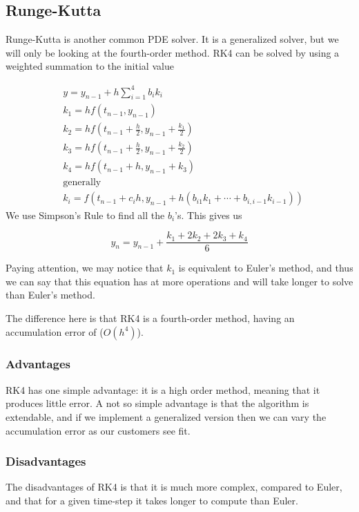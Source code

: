 \documentclass[12pt,letter]{article}
\begin{document}
\subsection{Runge-Kutta}
Runge-Kutta is another common PDE solver. It is a generalized solver, but we
will only be looking at the fourth-order method. RK4 can be solved by using a
weighted summation to the initial value

\begin{equation}\label{eq:rk4}
\begin{split}
    &y = y_{n-1} + h\sum_{i=1}^{4}b_ik_i \\ 
    &k_1 = hf(t_{n-1},y_{n-1}) \\
    &k_2 = hf(t_{n-1} + \frac{h}{2}, y_{n-1} + \frac{k_1}{2}) \\
    &k_3 = hf(t_{n-1} + \frac{h}{2}, y_{n-1} + \frac{k_2}{2}) \\
    &k_4 = hf(t_{n-1} + h, y_{n-1} + k_3) \\
    &\text{generally} \\
    &k_i = f(t_{n-1} + c_ih, y_{n-1} + h(b_{i1}k_1 + \cdots + b_{i,i-1}k_{i-1}))
\end{split}
\end{equation}
We use Simpson's Rule to find all the $b_i$'s. This gives us 

\begin{equation}
    y_n = y_{n-1} + \frac{k_1 + 2k_2 + 2k_3 + k_4}{6}
\end{equation}

Paying attention, we may notice that $k_1$ is equivalent to Euler's method, and
thus we can say that this equation has at more operations and will take longer
to solve than Euler's method. 

The difference here is that RK4 is a fourth-order method, having an accumulation
error of ($O(h^4)$).

\subsubsection{Advantages}
RK4 has one simple advantage: it is a high order method, meaning that it
produces little error. A not so simple advantage is that the algorithm is
extendable, and if we implement a generalized version then we can vary the
accumulation error as our customers see fit.
\subsubsection{Disadvantages}
The disadvantages of RK4 is that it is much more complex, compared to Euler, and
that for a given time-step it takes longer to compute than Euler.
\end{document}
